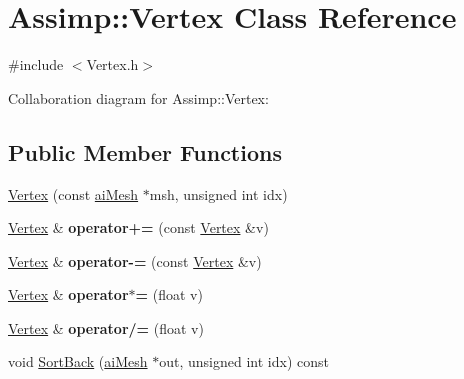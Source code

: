 \hypertarget{class_assimp_1_1_vertex}{\section{Assimp\+:\+:Vertex Class Reference}
\label{class_assimp_1_1_vertex}
}


{\ttfamily \#include $<$Vertex.\+h$>$}



Collaboration diagram for Assimp\+:\+:Vertex\+:
\subsection*{Public Member Functions}
\begin{DoxyCompactItemize}
\item 
\hyperlink{class_assimp_1_1_vertex_a033c3e271016c729f353726007b25d7e}{Vertex} (const \hyperlink{structai_mesh}{ai\+Mesh} $\ast$msh, unsigned int idx)
\item 
\hypertarget{class_assimp_1_1_vertex_a9f6a852165ac8f2ac562aa492661c8c9}{\hyperlink{struct_assimp_1_1_m_d2_1_1_vertex}{Vertex} \& {\bfseries operator+=} (const \hyperlink{struct_assimp_1_1_m_d2_1_1_vertex}{Vertex} \&v)}\label{class_assimp_1_1_vertex_a9f6a852165ac8f2ac562aa492661c8c9}

\item 
\hypertarget{class_assimp_1_1_vertex_a649d7f8f3a80cb08ead06bf4649c180f}{\hyperlink{struct_assimp_1_1_m_d2_1_1_vertex}{Vertex} \& {\bfseries operator-\/=} (const \hyperlink{struct_assimp_1_1_m_d2_1_1_vertex}{Vertex} \&v)}\label{class_assimp_1_1_vertex_a649d7f8f3a80cb08ead06bf4649c180f}

\item 
\hypertarget{class_assimp_1_1_vertex_a1f290d486d38f2d87dbd36a2f9fb5159}{\hyperlink{struct_assimp_1_1_m_d2_1_1_vertex}{Vertex} \& {\bfseries operator$\ast$=} (float v)}\label{class_assimp_1_1_vertex_a1f290d486d38f2d87dbd36a2f9fb5159}

\item 
\hypertarget{class_assimp_1_1_vertex_ac28c333114f93cb297b6f7e3fbfb4594}{\hyperlink{struct_assimp_1_1_m_d2_1_1_vertex}{Vertex} \& {\bfseries operator/=} (float v)}\label{class_assimp_1_1_vertex_ac28c333114f93cb297b6f7e3fbfb4594}

\item 
void \hyperlink{class_assimp_1_1_vertex_aef15a8e18a1f48c54fd056a67e676e6c}{Sort\+Back} (\hyperlink{structai_mesh}{ai\+Mesh} $\ast$out, unsigned int idx) const 
\end{DoxyCompactItemize}
